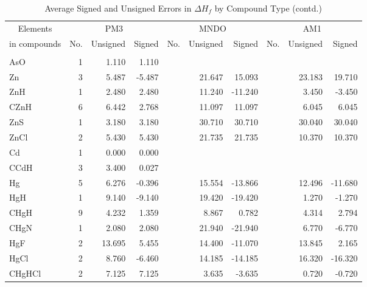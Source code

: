 \begin{table}
\caption{\label{avehoff}Average Signed and Unsigned Errors in $\Delta H_f$ by
 Compound Type (contd.)}
\compresstable
\begin{center}
\begin{tabular}{lrrrrrrrrr}
\multicolumn{1}{c}{Elements} & \multicolumn{3}{c}{PM3} & \multicolumn{3}{c}{MNDO} &
\multicolumn{3}{c}{AM1} \\
\multicolumn{1}{c}{in compounds} &  No. & Unsigned & Signed & No. & Unsigned & Signed & No. & Unsigned & Signed \\
\hline\\
  AsO       &     1 &    1.110 &    1.110 &     &          &          &     &          &          \\
      Zn      &      3 &    5.487 &   -5.487 &  &   21.647 &   15.093 &  &   23.183 &   19.710 \\
      ZnH     &      1 &    2.480 &    2.480 &  &   11.240 &  -11.240 &  &    3.450 &   -3.450 \\
      CZnH    &      6 &    6.442 &    2.768 &  &   11.097 &   11.097 &  &    6.045 &    6.045 \\
      ZnS     &      1 &    3.180 &    3.180 &  &   30.710 &   30.710 &  &   30.040 &   30.040 \\
      ZnCl    &      2 &    5.430 &    5.430 &  &   21.735 &   21.735 &  &   10.370 &   10.370 \\
  Cd        &   1 &    0.000 &    0.000 &     &          &          &     &          &          \\
  CCdH      &   3 &    3.400 &    0.027 &     &          &          &     &          &          \\
      Hg      &      5 &    6.276 &   -0.396 &  &   15.554 &  -13.866 &  &   12.496 &  -11.680 \\
      HgH     &      1 &    9.140 &   -9.140 &  &   19.420 &  -19.420 &  &    1.270 &   -1.270 \\
      CHgH    &      9 &    4.232 &    1.359 &  &    8.867 &    0.782 &  &    4.314 &    2.794 \\
      CHgN    &      1 &    2.080 &    2.080 &  &   21.940 &  -21.940 &  &    6.770 &   -6.770 \\
      HgF     &      2 &   13.695 &    5.455 &  &   14.400 &  -11.070 &  &   13.845 &    2.165 \\
      HgCl    &      2 &    8.760 &   -6.460 &  &   14.185 &  -14.185 &  &   16.320 &  -16.320 \\
      CHgHCl  &      2 &    7.125 &    7.125 &  &    3.635 &   -3.635 &  &    0.720 &   -0.720 \\

\end{tabular}
\end{center}
\end{table}
